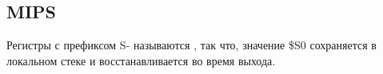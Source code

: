 \subsection{MIPS}



Регистры с префиксом S- называются , так что, значение \$S0 сохраняется 
в локальном стеке и восстанавливается во время выхода.

